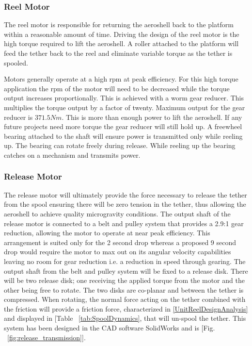 \subsubsection{Reel Motor}

\indent\indent The reel motor is responsible for returning the aeroshell back to the platform within a reasonable amount of time. Driving the design of the reel motor is the high torque required to lift the aeroshell. A roller attached to the platform will feed the tether back to the reel and eliminate variable torque as the tether is spooled.

\indent\indent Motors generally operate at a high rpm at peak efficiency. For this high torque application the rpm of the motor will need to be decreased while the torque output increases proportionally. This is achieved with a worm gear reducer. This multiplies the torque output by a factor of twenty. Maximum output for the gear reducer is $371.5 Nm$. This is more than enough power to lift the aeroshell. If any future projects need more torque the gear reducer will still hold up. A freewheel bearing attached to the shaft will ensure power is transmitted only while reeling up. The bearing can rotate freely during release. While reeling up the bearing catches on a mechanism and transmits power.

\subsubsection{Release Motor} \label{ReleaseMotorDesignAnalysis}

\indent\indent The release motor will ultimately provide the force necessary to release the tether from the spool ensuring there will be zero tension in the tether, thus allowing the aeroshell to achieve quality microgravity conditions. The output shaft of the release motor is connected to a belt and pulley system that provides a 2.9:1 gear reduction, allowing the motor to operate at near peak efficiency. This arrangement is suited only for the 2 second drop whereas a proposed 9 second drop would require the motor to max out on its angular velocity capabilities leaving no room for gear reduction i.e. a reduction in speed through gearing. The output shaft from the belt and pulley system will be fixed to a release disk. There will be two release disk; one receiving the applied torque from the motor and the other being free to rotate. The two disks are co-planar and between the tether is compressed. When rotating, the normal force acting on the tether combined with the friction will provide a friction force, characterized in \ref{UnitReelDesignAnalysis} and displayed in [Table ~\ref{tab:SpoolDynamics}, that will un-spool the tether. This system has been designed in the CAD software SolidWorks and is [Fig. ~\ref{fig:release_transmission}]. 


